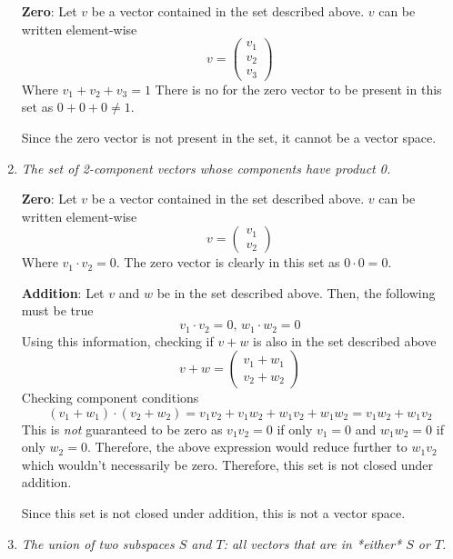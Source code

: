 \documentclass{article}
\begin{document}
\begin{enumerate}
    \bigbreak

    {\bf Zero}: Let $ v $ be a vector contained in the set described above.
    $ v $ can be written element-wise
    $$ v = \begin{pmatrix}
        v_1 \\
        v_2 \\
        v_3
    \end{pmatrix} $$
    Where $ v_1 + v_2 + v_3 = 1 $ There is no for the zero vector to be
    present in this set as $ 0 + 0 + 0 \neq 1 $.

    \bigbreak

    Since the zero vector is not present in the set, it cannot be a vector
    space.

    \item \textit{The set of 2-component vectors whose components have product 0.}

    \bigbreak

    {\bf Zero}: Let $ v $ be a vector contained in the set described above. $
    v $ can be written element-wise
    $$ v = \begin{pmatrix}
        v_1 \\
        v_2
    \end{pmatrix} $$
    Where $ v_1 \cdot v_2 = 0 $. The zero vector is clearly in this set as $
    0 \cdot 0 = 0 $.

    \bigbreak

    {\bf Addition}: Let $ v $ and $ w $ be in the set described above. Then,
    the following must be true
    $$ v_1 \cdot v_2 = 0,\, w_1 \cdot w_2 = 0 $$
    Using this information, checking if $ v + w $ is also in the set
    described above
    $$ v + w = \begin{pmatrix}
        v_1 + w_1 \\
        v_2 + w_2
    \end{pmatrix} $$ 
    Checking component conditions
    $$ (v_1 + w_1) \cdot (v_2 + w_2) = v_1 v_2 + v_1 w_2 + w_1 v_2 + w_1 w_2
    = v_1 w_2 + w_1 v_2 $$
    This is \textit{not} guaranteed to be zero as $ v_1 v_2 = 0 $ if only $
    v_1 = 0 $ and $ w_1 w_2 = 0 $ if only $ w_2 = 0 $. Therefore, the above
    expression would reduce further to $ w_1 v_2 $ which wouldn't necessarily
    be zero. Therefore, this set is not closed under addition.
    
    \bigbreak

    Since this set is not closed under addition, this is not a vector space.

    \item \textit{The union of two subspaces $S$ and $T$: all vectors that
    are in *either* $S$ or $T$.}


\end{enumerate}
\end{document}
